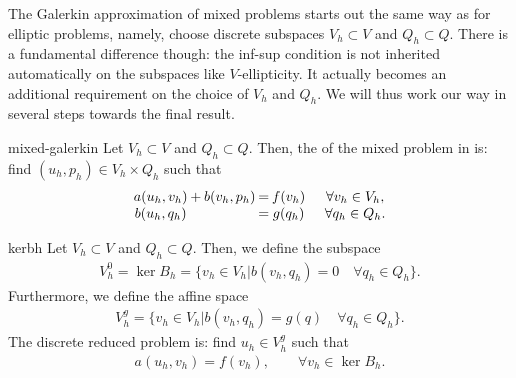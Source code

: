 \begin{intro}
  The Galerkin approximation of mixed problems starts out the same way
  as for elliptic problems, namely, choose discrete subspaces
  $V_h\subset V$ and $Q_h \subset Q$. There is a fundamental
  difference though: the inf-sup condition is not inherited
  automatically on the subspaces like $V$-ellipticity. It actually becomes
  an additional requirement on the choice of $V_h$ and
  $Q_h$. We will thus work our way in several steps towards the final
  result.
\end{intro}

\begin{Definition}{mixed-galerkin}
  Let $V_h\subset V$ and $Q_h\subset Q$. Then, the  of the mixed problem in
   is: find
  $(u_h, p_h)\in V_h\times Q_h$ such that
  \begin{gather}
    \label{eq:galerkin:3}
        \arraycolsep.1em
    \begin{matrix}
      a(u_h,v_h) &+& b(v_h,p_h) &=& f(v_h) &\quad&\forall v_h\in V_h, \\
      b(u_h,q_h) && &=& g(q_h) &&\forall q_h\in Q_h.
    \end{matrix}
  \end{gather}
\end{Definition}

\begin{Definition}{kerbh}
  Let $V_h\subset V$ and $Q_h\subset Q$. Then, we define the subspace
  \begin{gather}
    \label{eq:galerkin:1}
    V_h^0 = \ker{B_h} = \bigl\{v_h\in V_h \big|
    b(v_h, q_h) = 0 \quad\forall q_h\in Q_h
    \bigr\}.
  \end{gather}
  Furthermore, we define the affine space
  \begin{gather}
    \label{eq:galerkin:2}
    V_h^g = \bigl\{v_h\in V_h \big|
    b(v_h, q_h) = g(q) \quad\forall q_h\in Q_h
    \bigr\}.
  \end{gather}
  The discrete reduced problem is: find $u_h\in V_h^g$ such that
  \begin{gather}
    \label{eq:galerkin:4}
    a(u_h, v_h) = f(v_h), \qquad\forall v_h \in \ker{B_h}.
  \end{gather}
\end{Definition}


